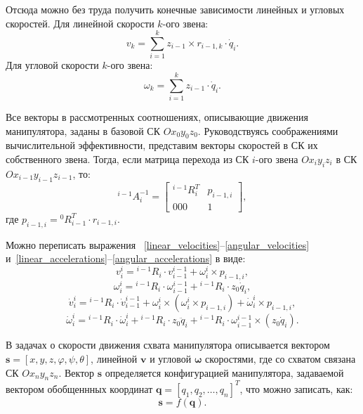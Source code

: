 Отсюда можно без труда получить конечные зависимости линейных и угловых скоростей. Для линейной скорости $k$-ого звена:
\begin{equation}
	v_k = \sum_{i = 1}^{k} z_{i-1} \times r_{i-1, k} \cdot \dot{q}_i.
\end{equation}
Для угловой скорости $k$-ого звена:
\begin{equation}
	\omega_k = \sum_{i = 1}^{k} z_{i-1} \cdot \dot{q}_i.
\end{equation}

Все векторы в рассмотренных соотношениях, описывающие движения манипулятора, заданы в базовой СК $Ox_{0}y_{0}z_{0}$. Руководствуясь соображениями вычислительной эффективности, представим векторы скоростей в СК их собственного звена. Тогда, если матрица перехода из СК $i$-ого звена $Ox_{i}y_{i}z_{i}$ в СК $Ox_{i-1}y_{i-1}z_{i-1}$, то:
\begin{equation}
	{}^{i-1}\!A_{i}^{-1} = 
	\begin{bmatrix}
		{}^{i-1}\!R_{i}^T	& {p}_{i-1,i} \\
		000	& 1
	\end{bmatrix}\!\!\!,
\end{equation}
где ${p}_{i-1,i} = {}^0\!R_{i-1}^T \cdot r_{i-1,i}$.

Можно переписать выражения ~\eqref{linear_velocities}--\eqref{angular_velocities} и~\eqref{linear_accelerations}--\eqref{angular_accelerations} в виде:
\begin{equation}
	v_i^i = {}^{i-1}\!R_{i} \cdot v^{i-1}_{i-1} + \omega^{i}_{i} \times p_{i-1,i},
\end{equation}
\begin{equation}
	\omega^{i}_{i} = {}^{i-1}\!R_{i} \cdot \omega^{i-1}_{i-1} + {}^{i-1}\!R_{i} \cdot z_0 \dot{q}_i,
\end{equation}
\begin{equation}
	\dot{v}^{i}_{i} = {}^{i-1}\!R_{i} \cdot \dot{v}^{i-1}_{i-1} + \omega^i_i \times (\omega^i_i \times p_{i-1,i}) + \dot{\omega}^i_i \times p_{i-1, i},
\end{equation}
\begin{equation}
	\dot{\omega}^i_i = {}^{i-1}\!R_{i} \cdot \dot{\omega}^i_i + {}^{i-1}\!R_{i} \cdot z_0 \ddot{q}_i + {}^{i-1}\!R_{i} \cdot \omega^{i-1}_{i-1} \times (z_0 \dot{q}_i).
\end{equation}

В задачах о скорости движения схвата манипулятора описывается вектором $\mathbf{s} = [x,y,z,\varphi, \psi, \theta]$, линейной $ \bm{v} $ и угловой $ \bm{\omega} $ скоростями, где со схватом связана СК $ Ox_{n}y_{n}z_{n} $. Вектор $ \mathbf{s} $ определяется конфигурацией манипулятора, задаваемой вектором обобщеннных координат $ \mathbf{q} = [q_1, q_2, \dots, q_n]^T $, что можно записать, как:
\begin{equation}\label{s_fq}
	\mathbf{s} = f (\mathbf{q}).
\end{equation}

